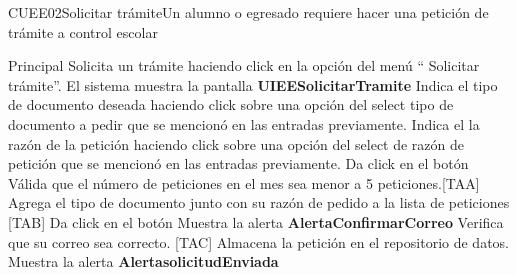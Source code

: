 \begin{UseCase}{CUEE02}{Solicitar trámite}{Un alumno o egresado requiere hacer una petición de trámite a control escolar}
{\begin{itemize}
    \end{itemize}
  }
\end{UseCase}

\begin{UCtrayectoria}{Principal}
  \UCpaso[\UCactor] Solicita un trámite haciendo click en la opción del menú `` Solicitar trámite”.
  \UCpaso El sistema muestra la pantalla  {\bf UIEESolicitarTramite}
  \UCpaso[\UCactor] Indica el tipo de documento deseada haciendo click sobre una opción del select tipo de documento a pedir  que se mencionó en las entradas previamente.
  \UCpaso[\UCactor] Indica el la razón de la petición haciendo click sobre una opción del select de razón de petición que se mencionó en las entradas previamente.
  \UCpaso[\UCactor] Da click en el botón 
  \UCpaso  Válida que el número de peticiones en el mes sea menor a 5 peticiones.[TAA] 
  \UCpaso Agrega el tipo de documento junto con su razón de pedido a la lista de peticiones [TAB]
  \UCpaso[\UCactor]  Da click en el botón 
  \UCpaso Muestra la alerta {\bf AlertaConfirmarCorreo} 
  \UCpaso[\UCactor] Verifica que su correo sea correcto. [TAC]
  \UCpaso Almacena la petición en el repositorio de datos.
  \UCpaso Muestra la alerta  {\bf AlertasolicitudEnviada}
\end{UCtrayectoria}


